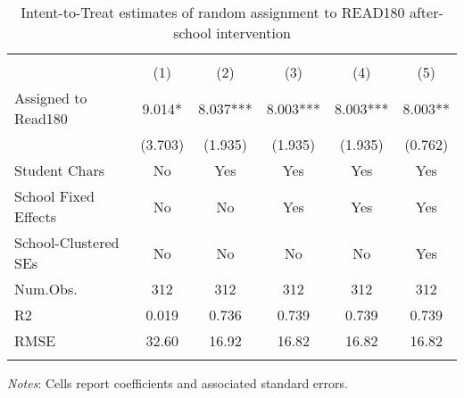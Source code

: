 \begin{table}

\caption{Intent-to-Treat estimates of random assignment to READ180 after-school intervention \label{tab:itt}}
\centering
\begin{threeparttable}
\begin{tabular}[t]{lccccc}
\hline 
\hline \\[-1.8ex] 
  & (1) & (2) & (3) & (4) & (5)\\
\midrule
Assigned to Read180 & 9.014* & 8.037*** & 8.003*** & 8.003*** & 8.003**\\
 & (3.703) & (1.935) & (1.935) & (1.935) & (0.762)\\
\midrule
Student Chars & No & Yes & Yes & Yes & Yes\\
School Fixed Effects & No & No & Yes & Yes & Yes\\
School-Clustered SEs & No & No & No & No & Yes\\
Num.Obs. & 312 & 312 & 312 & 312 & 312\\
R2 & 0.019 & 0.736 & 0.739 & 0.739 & 0.739\\
RMSE & 32.60 & 16.92 & 16.82 & 16.82 & 16.82\\
\hline 
\hline \\[-1.8ex] 
\end{tabular}
\begin{tablenotes}
\item \small \textit{Notes}: Cells report coefficients and associated standard errors.
\end{tablenotes}
\end{threeparttable}
\end{table}
